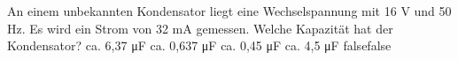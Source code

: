     {An einem unbekannten Kondensator liegt eine Wechselspannung mit 16 V und 50 Hz. Es wird ein Strom von 32 mA gemessen. Welche Kapazität hat der Kondensator?}
    {ca. 6,37 \si{\micro\farad}}
    {ca. 0,637 \si{\micro\farad}}
    {ca. 0,45 \si{\micro\farad}}
    {ca. 4,5 \si{\micro\farad}}
    {false}{false}